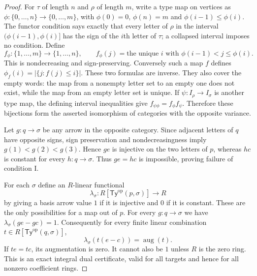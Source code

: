 \begin{proof}
For $\tau$ of length $n$ and $\rho$ of length $m$, write a type map on
vertices as
$\phi:\{0,\ldots,n\}\to\{0,\ldots,m\}$, with
$\phi(0)=0$, $\phi(n)=m$ and $\phi(i-1)\leq\phi(i)$. The functor
condition says exactly that every letter of $\rho$ in the interval
$(\phi(i-1),\phi(i)]$ has the sign of the $i$th letter of $\tau$;
a collapsed interval imposes no condition. Define
\[
 f_\phi:\{1,\ldots,m\}\longrightarrow\{1,\ldots,n\},\qquad
 f_\phi(j)=\text{the unique }i\text{ with }\phi(i-1)<j\leq\phi(i).
\]
This is nondecreasing and sign-preserving. Conversely such a map $f$
defines
$\phi_f(i)=|\{j:f(j)\leq i\}|$. These two formulas are inverse.
They also cover the empty words: the map from a nonempty letter set to
an empty one does not exist, while the map from an empty letter set is
unique. If $\psi:I_\rho\to I_\sigma$ is another type map, the defining
interval inequalities give
$f_{\psi\phi}=f_\phi f_\psi$. Therefore these bijections form the
asserted isomorphism of categories with the opposite variance.

Let $g:q\to\sigma$ be any arrow in the opposite category. Since
adjacent letters of $q$ have opposite signs, sign preservation and
nondecreasingness imply
$g(1)<g(2)<g(3)$. Hence $ge$ is injective on the two letters of $p$,
whereas $hc$ is constant for every $h:q\to\sigma$. Thus $ge=hc$ is
impossible, proving failure of condition I.

For each $\sigma$ define an $R$-linear functional
\[
 \lambda_\sigma:R[\mathsf{Ty}^{\mathrm{op}}(p,\sigma)]\to R
\]
by giving a basis arrow value $1$ if it is injective and $0$ if it is
constant. These are the only possibilities for a map out of $p$.
For every $g:q\to\sigma$ we have
$\lambda_\sigma(ge-gc)=1$. Consequently for every finite linear
combination $t\in R[\mathsf{Ty}^{\mathrm{op}}(q,\sigma)]$,
\[
 \lambda_\sigma(t(e-c))=\operatorname{aug}(t).
\]
If $te=tc$, its augmentation is zero. It cannot also be $1$ unless
$R$ is the zero ring. This is an exact integral dual certificate,
valid for all targets and hence for all nonzero coefficient rings.


\end{proof}
